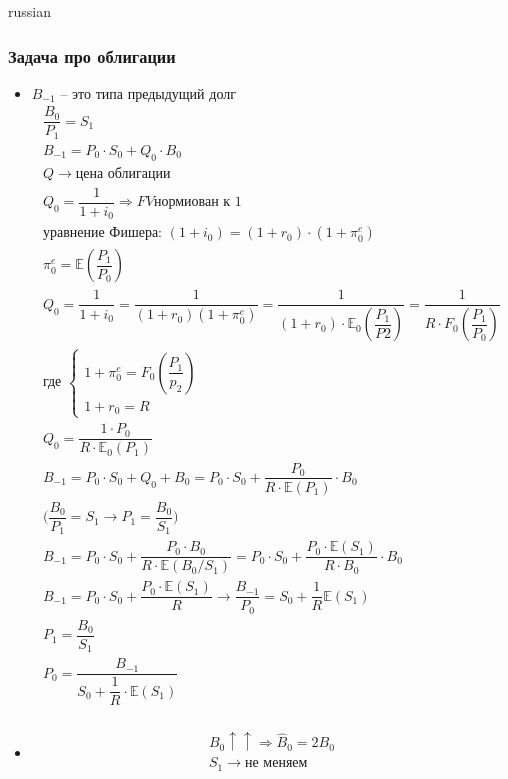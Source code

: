 \documentclass{article}
\begin{document}
\begin{otherlanguage*}{russian}
\subsubsection*{Задача про облигации}
\begin{itemize}
\item  
$ B_{-1} $ -- это типа предыдущий долг 
\begin{align*}
\dfrac{B_0}{P_1} = S_1 \\
B_{-1} = P_0 \cdot S_0 + Q_0 \cdot B_0 \\
Q \rightarrow \text{цена облигации } \\
Q_0 = \dfrac{1}{1 + i_0} \Rightarrow FV \text{нормиован к 1} \\
\text{уравнение Фишера: } (1 + i_0) = (1 + r_0) \cdot (1 + \pi^e_0 ) \\
\pi^e_0 = \mathbb{E} (\dfrac{P_1}{P_0} ) \\
Q_0 = \dfrac{1}{1 + i_0} = \dfrac{1}{(1 + r_0) (1 + \pi^e_0) } = \dfrac{1}{(1 + r_0) \cdot \mathbb{E}_0(\dfrac{P_1}{P2})} = \dfrac{1}{R \cdot F_0(\dfrac{P_1}{P_0})}\\
\text{где } \begin{cases}
1 + \pi^e_0 = F_0 ( \dfrac{P_1}{p_2}) \\
1 + r_0 = R 
\end{cases} \\
Q_0 = \dfrac{1 \cdot P_0}{R \cdot \mathbb{E}_0 (P_1) } \\
B_{-1} = P_0 \cdot S_0 + Q_0 + B_0 = P_0 \cdot S_0 + \dfrac{P_0}{R \cdot \mathbb{E}(P_1)} \cdot B_0 \\
\Big( \dfrac{B_0}{P_1} = S_1 \rightarrow P_1 = \dfrac{B_0}{S_1} \Big) \\
B_{-1} = P_0 \cdot S_0 + \dfrac{P_0 \cdot B_0}{R \cdot \mathbb{E} (B_0 / S_1)} = P_0 \cdot S_0 + \dfrac{P_0 \cdot \mathbb{E} (S_1)}{R \cdot B_0 } \cdot B_0 \\
B_{-1} = P_0 \cdot S_0 + \dfrac{P_0 \cdot \mathbb{E} (S_1)}{R} \rightarrow \dfrac{B_{-1}}{P_0} = S_0 + \dfrac{1}{R} \mathbb{E} (S_1) \\
P_1 = \dfrac{B_0}{S_1} \\
P_0 = \dfrac{B_{-1} }{S_0 + \dfrac{1}{R} \cdot \mathbb{E} (S_1)} \\
\end{align*}
\item 
\begin{align*}
B_0 \uparrow \uparrow \Rightarrow \hat B_0 =  2 B_0  \\
S_1 \rightarrow \text{не меняем} \\

\end{align*}
\end{itemize}
\end{otherlanguage*}
\end{document}
